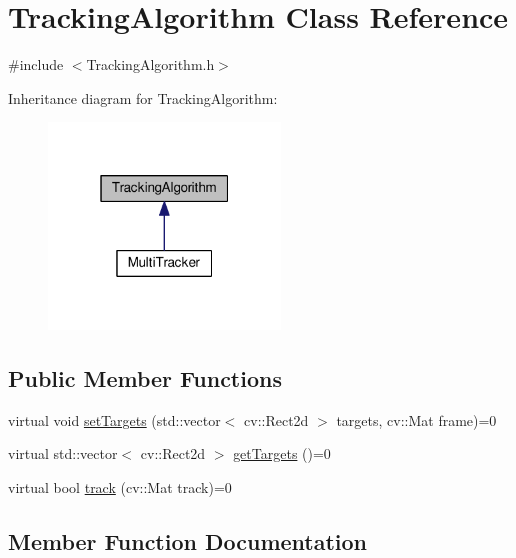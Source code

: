 \hypertarget{class_tracking_algorithm}{}\section{Tracking\+Algorithm Class Reference}
\label{class_tracking_algorithm}


{\ttfamily \#include $<$Tracking\+Algorithm.\+h$>$}



Inheritance diagram for Tracking\+Algorithm\+:\nopagebreak
\begin{figure}[H]
\begin{center}
\leavevmode
\includegraphics[width=175pt]{class_tracking_algorithm__inherit__graph}
\end{center}
\end{figure}
\subsection*{Public Member Functions}
\begin{DoxyCompactItemize}
\item 
virtual void \hyperlink{class_tracking_algorithm_a35be145d443c348e4de6d79a3cfe7c8f}{set\+Targets} (std\+::vector$<$ cv\+::\+Rect2d $>$ targets, cv\+::\+Mat frame)=0
\item 
virtual std\+::vector$<$ cv\+::\+Rect2d $>$ \hyperlink{class_tracking_algorithm_af92544c5d3056b6879e03e66630c96db}{get\+Targets} ()=0
\item 
virtual bool \hyperlink{class_tracking_algorithm_abdc72e17100fd63557f37f83e9ddaf34}{track} (cv\+::\+Mat track)=0
\end{DoxyCompactItemize}


\subsection{Member Function Documentation}
